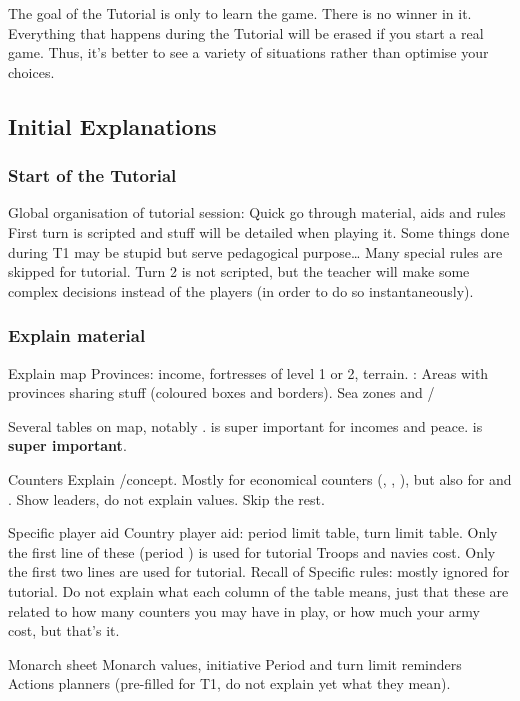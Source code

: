The goal of the Tutorial is only to learn the game. There is no winner in
it. Everything that happens during the Tutorial will be erased if you start a
real game. Thus, it's better to see a variety of situations rather than
optimise your choices.

\subsection{Initial Explanations}
\subsubsection{Start of the Tutorial}
\aparag Global organisation of tutorial session:
\bparag Quick go through material, aids and rules
\bparag First turn is scripted and stuff will be detailed when playing it.
\bparag Some things done during T1 may be stupid but serve pedagogical
purpose\ldots
\bparag Many special rules are skipped for tutorial.
\bparag Turn 2 is not scripted, but the teacher will make some complex
decisions instead of the players (in order to do so instantaneously).

\subsubsection{Explain material}
\aparag Explain map
\bparag Provinces: income, fortresses of level 1 or 2, terrain.
\bparag \ROTW: Areas with provinces sharing stuff (coloured boxes and
borders).
\bparag Sea zones and \CTZ/\STZ

\aparag \STAB
\bparag Several tables on \ROTW map, notably \STAB.
\bparag \STAB is super important for incomes and peace.
\bparag \STAB is \textbf{super important}.

\aparag Counters
\bparag Explain \Faceplus/\facemoins concept. Mostly for economical counters
(\COL, \TP, \TradeFLEET), but also for \ARMY and \FLEET.
\bparag Show leaders, do not explain values.
\bparag Skip the rest.

\aparag Specific player aid
\bparag Country player aid: period limit table, turn limit table. Only the
first line of these (period ) is used for tutorial
\bparag Troops and navies cost. Only the first two lines are used for tutorial.
\bparag Recall of Specific rules: mostly ignored for tutorial.
\bparag Do not explain what each column of the table means, just that these
are related to how many counters you may have in play, or how much your army
cost, but that's it.

\aparag Monarch sheet
\bparag Monarch values, initiative
\bparag Period and turn limit reminders
\bparag Actions planners (pre-filled for T1, do not explain yet what they
mean).

